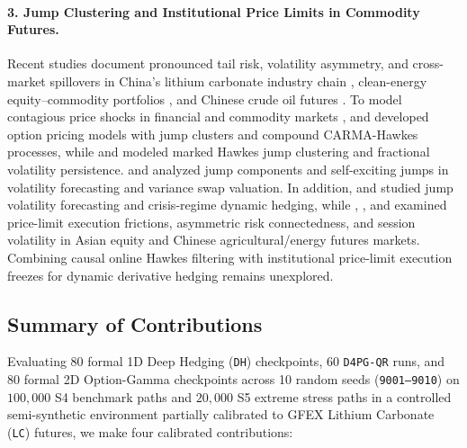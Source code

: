 \documentclass[11pt,a4paper]{article}
\begin{document}
\paragraph{3. Jump Clustering and Institutional Price Limits in Commodity Futures.}
Recent studies document pronounced tail risk, volatility asymmetry, and cross-market spillovers in China's lithium carbonate industry chain \citep{Kong2024,Wang2025}, clean-energy equity--commodity portfolios \citep{Coskun2023}, and Chinese crude oil futures \citep{Naqvi2023,Geng2025}. To model contagious price shocks in financial and commodity markets \citep{AitSahalia2015,Bacry2015}, \citet{Brignone2023} and \citet{Mercuri2024} developed option pricing models with jump clusters and compound CARMA-Hawkes processes, while \citet{ChenClements2024} and \citet{deTruchis2025} modeled marked Hawkes jump clustering and fractional volatility persistence. \citet{Qiao2025} and \citet{HeYan2026} analyzed jump components and self-exciting jumps in volatility forecasting and variance swap valuation. In addition, \citet{He2026} and \citet{Jouini2026} studied jump volatility forecasting and crisis-regime dynamic hedging, while \citet{KimRhee1997}, \citet{Zhang2023}, and \citet{Xia2024} examined price-limit execution frictions, asymmetric risk connectedness, and session volatility in Asian equity and Chinese agricultural/energy futures markets. Combining causal online Hawkes filtering with institutional price-limit execution freezes for dynamic derivative hedging remains unexplored.

\subsection{Summary of Contributions}
Evaluating $80$ formal 1D Deep Hedging (\texttt{DH}) checkpoints, $60$ \texttt{D4PG-QR} runs, and $80$ formal 2D Option-Gamma checkpoints across 10 random seeds (\texttt{9001--9010}) on $100,000$ S4 benchmark paths and $20,000$ S5 extreme stress paths in a controlled semi-synthetic environment partially calibrated to GFEX Lithium Carbonate (\texttt{LC}) futures, we make four calibrated contributions:
\end{document}
